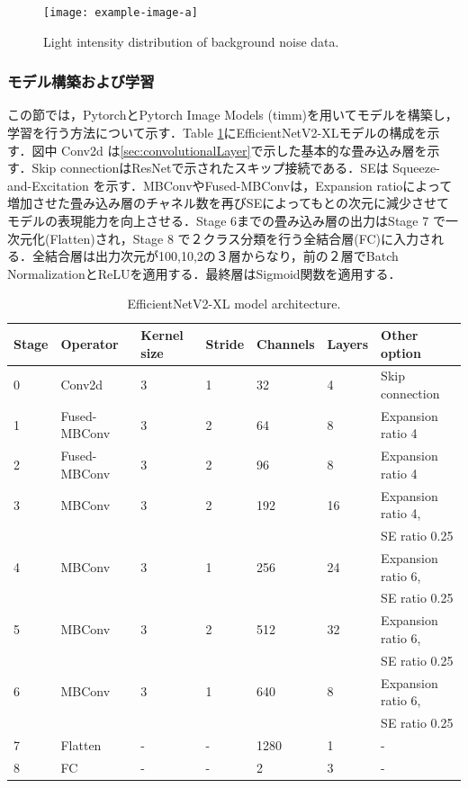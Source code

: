 \begin{figure}[H]
    \centering
    \texttt{[image: example-image-a]}
    \caption{Light intensity distribution of background noise data.}
    \label{fig:backgroundnoise}
\end{figure}

\subsubsection{モデル構築および学習}
この節では，Pytorch\cite{paszke2019}とPytorch Image Models (timm)\cite{rw2019timm}を用いてモデルを構築し，学習を行う方法について示す．Table \ref{table:EffNetV2}にEfficientNetV2-XLモデルの構成を示す\cite{tan2021}．図中 Conv2d は\ref{sec:convolutionalLayer}で示した基本的な畳み込み層を示す．Skip connectionはResNet\cite{he2016}で示されたスキップ接続である．SEは Squeeze-and-Excitation \cite{hu2018} を示す．MBConv\cite{tan2019}やFused-MBConv\cite{tan2021}は，Expansion ratioによって増加させた畳み込み層のチャネル数を再びSEによってもとの次元に減少させてモデルの表現能力を向上させる．Stage 6までの畳み込み層の出力はStage 7 で一次元化(Flatten)され，Stage 8 で２クラス分類を行う全結合層(FC)に入力される．全結合層は出力次元が100,10,2の３層からなり，前の２層でBatch Normalization\cite{ioffe2015}とReLU\cite{nair2010}を適用する．最終層はSigmoid関数を適用する．
\begin{table}[H]
    \centering
    \caption{EfficientNetV2-XL model architecture.}
    \label{table:EffNetV2}
    \begin{tabular}{lllllll}
    Stage & Operator & Kernel size & Stride & Channels & Layers & Other option \\ \hline \hline
    0 & Conv2d & 3 & 1 & 32 & 4 & Skip connection \\ \hline
    1 & Fused-MBConv & 3 & 2 & 64 & 8 & Expansion ratio 4 \\ \hline
    2 & Fused-MBConv & 3 & 2 & 96 & 8 & Expansion ratio 4 \\ \hline
    3 & MBConv & 3 & 2 & 192 & 16 & Expansion ratio 4, \\ &&&&&& SE ratio 0.25  \\ \hline
    4 & MBConv & 3 & 1 & 256 & 24 & Expansion ratio 6, \\ &&&&&& SE ratio 0.25  \\ \hline
    5 & MBConv & 3 & 2 & 512 & 32 & Expansion ratio 6, \\ &&&&&& SE ratio 0.25  \\ \hline
    6 & MBConv & 3 & 1 & 640 & 8 & Expansion ratio 6, \\ &&&&&& SE ratio 0.25  \\ \hline
    7 & Flatten & - & - & 1280 & 1 & - \\ \hline
    8 & FC & - & - & 2 & 3 & - \\ \hline
    \end{tabular}
\end{table}

